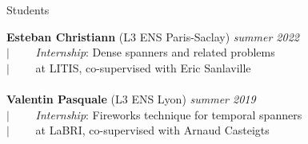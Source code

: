 \documentclass[french]{resume} %
\begin{document}
	
	\begin{rSection}{Students}
		
		{\bf Esteban Christiann} (L3 ENS Paris-Saclay) \hfill {\em summer 2022}
		\\
		$| \qquad$ \textit{Internship}: Dense spanners and related problems\\
		$| \qquad$ at LITIS, co-supervised with Eric Sanlaville
		\\ \\	
		{\bf Valentin Pasquale} (L3 ENS Lyon) \hfill {\em summer 2019} 
		\\
		$| \qquad$ \textit{Internship}: Fireworks technique for temporal spanners\\
		$| \qquad$ at LaBRI, co-supervised with Arnaud Casteigts
	\end{rSection}
	
	
\end{document}
